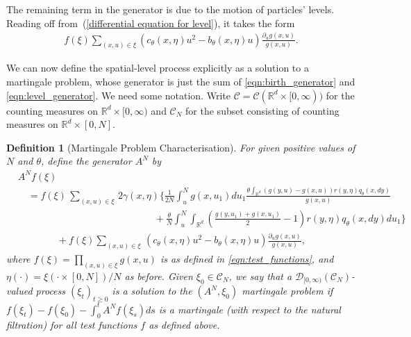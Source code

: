\documentclass[12pt]{article}
\newtheorem{definition}[theorem]{Definition}
\newcommand{\IR}{\mathbb R}
\newcommand{\lp}{\xi}              %
\numberwithin{equation}{section}
\begin{document}
The remaining term in the generator is due to the motion of particles' levels.
Reading off from~(\ref{differential equation for level}),
it takes the form
\begin{align} \label{eqn:level_generator}
    f(\lp)
    \sum_{(x, u) \in \lp}
    \left(
        c_\theta(x, \eta) u^2
        -
        b_\theta(x, \eta) u
    \right)
    \frac{\partial_u g(x,u)}{g(x,u)} .
\end{align}


We can now define the spatial-level process
explicitly as a solution to a martingale problem,
whose generator is just the sum of
\eqref{eqn:birth_generator} and \eqref{eqn:level_generator}.
We need some notation. 
Write ${\mathcal C}={\mathcal C}(\IR^d\times [0,\infty))$ for the counting measures 
on $\IR^d\times [0,\infty)$ and ${\mathcal C}_N$ for the subset consisting of 
counting measures on $\IR^d\times [0,N]$.

\begin{definition}[Martingale Problem Characterisation]
    \label{defn:lookdown_mgale}
For given positive values of $N$ and $\theta$, define the generator $A^N$
by
\begin{equation}
	\label{eqn:lookdown_generator}
\begin{split}
& A^{N}f(\lp ) \\
&\quad =
    f(\lp)
    \,\sum_{(x,u)\in \lp}\,
    2 \gamma(x, \eta)
    \Bigg\{ \frac{1}{2N} \int_u^N g(x,u_1) du_1
            \frac{
                \theta \int_{\IR^d}
                (g(y,u) - g(x,u))
                r(y, \eta) q_{\theta}(x,dy)
            }{ g(x,u) }
        \\
    &\qquad\qquad\qquad\qquad\qquad\qquad\qquad {} +
        \frac{\theta}{N} \int_u^N
        \int_{\IR^d}\left(
            \frac{ g(y,u_1) + g(x,u_1) }{ 2 } - 1
        \right)
        r(y, \eta) q_{\theta}(x,dy)
        du_1
    \Bigg\}\\
    &\qquad\qquad {} +
    f(\lp) \sum_{(x,u)\in\lp}\,
    \left(
        c_\theta(x,\eta) u^2 - b_{\theta}(x,\eta)u
    \right)
    \frac{\partial_u g(x,u)}{g(x,u)}
    ,
\end{split}
\end{equation}
where $f(\lp) = \prod_{(x, u) \in \lp} g(x, u)$ is as defined in \eqref{eqn:test_functions},
and $\eta(\cdot) = \lp(\cdot \times [0, N]) / N$
as before. 
Given $\lp_0 \in {\mathcal C}_N$, 
we say that a ${\mathcal D}_{[0,\infty)}({\mathcal C}_N)$-valued process 
$(\xi_t)_{t \ge 0}$ is a solution to the $(A^N, \lp_0)$ martingale problem
if $f(\lp_t) - f(\lp_0)-\int_0^t A^N f(\lp_s) ds$ is a martingale (with 
respect to the natural filtration) for all 
test functions $f$ as defined above.
\end{definition}
\end{document}
